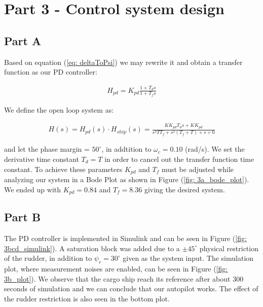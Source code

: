 \section{Part 3 - Control system design}

\subsection{Part A}

Based on equation (\ref{eq: deltaToPsi}) we may rewrite it and obtain a transfer function as our PD controller:

\begin{equation}
    \begin{align}
        H_{pd} = K_{pd}\frac{1+T_ds}{1+T_fs}
    \end{align}
\end{equation}

We define the open loop system as: 

\begin{equation}
    \begin{align}
        H(s) = H_{pd}(s) \cdot H_{ship}(s) = \frac{KK_{pd}T_ds+KK_{pd}}{s^3TT_f+s^2(T_f+T)+s+0}
    \end{align}
\end{equation}

 and let the phase margin = $50^{\circ}$, in addtition to $\omega_c = 0.10$ (rad/s). 
We set the derivative time constant $T_d = T$ in order to cancel out the transfer function time constant. \newline
To achieve these parameters $K_{pd}$ and $T_f$ must be adjusted while analyzing our system in a Bode Plot as shown in Figure (\ref{fig: 3a_bode_plot}). We ended up with $K_{pd} = 0.84$ and $T_f = 8.36$ giving the desired system. 

\subsection{Part B}
The PD controller is implemented in Simulink and can be seen in Figure (\ref{fig: 3bcd_simulink}). A saturation block was added due to a $\pm 45^{\circ}$ physical restriction of the rudder, in addition to $\psi_r = 30^{\circ}$ given as the system input. The simulation plot, where measurement noises are enabled, can be seen in Figure (\ref{fig: 3b_plot}). We observe that the cargo ship reach its reference after about 300 seconds of simulation and we can conclude that our autopilot works. The effect of the rudder restriction is also seen in the bottom plot.

